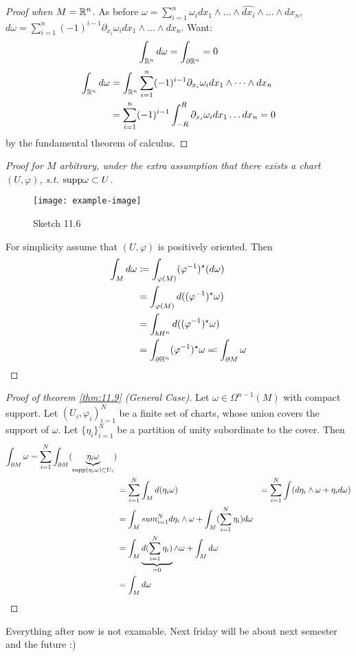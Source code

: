 \begin{proof}[Proof when \(M=\mathbb{R}^n\)]
    As before \(\omega=\sum_{i=1}^n\omega_i dx_1\wedge \dots \wedge \hat{dx_i}\wedge \dots\wedge dx_n\),
    \(d\omega=\sum_{i=1}^n(-1)^{i-1}\partial_{x_i}\omega_i dx_1\wedge \dots \wedge dx_n\). Want:
    \[\int_{\mathbb{R}^n}d\omega=\int_{\partial \mathbb{R}^n}=0\]
    \begin{align*}
        \int_{\mathbb{R}^n} d\omega&=\int_{\mathbb{R}^n} \sum_{i=1}^n(-1)^{i-1}\partial_{x_i}\omega_i dx_1\wedge \dots \wedge dx_n \\
        &=\sum_{i=1}^n(-1)^{i-1}\int_{-R}^R\partial_{x_i}\omega_i dx_1\dots dx_n =0
    \end{align*}
    by the fundamental theorem of calculus.
\end{proof}

\begin{proof}[Proof  for \(M\) arbitrary, under the extra assumption that  there exists a chart \((U,\varphi)\), s.t. 
              \(\text{supp}\omega\subset U\)]
    \begin{figure}[H]\label{fig:11.6}
        \centering
        \texttt{[image: example-image]}
        \caption{Sketch 11.6}
    \end{figure}
    For simplicity assume that \((U,\varphi)\) is positively oriented. Then 
    \begin{align*}
        \int_M d\omega&\coloneqq \int_{\varphi(M)}(\varphi^{-1})^\star(d\omega)\\
        &=\int_{\varphi(M)}d((\varphi^{-1})^\star \omega)\\
        &=\int_{bH^n} d((\varphi^{-1})^\star \omega)\\
        &=\int_{\partial \mathbb{H}^n} (\varphi^{-1})^\star \omega\eqqcolon\int_{\partial M} \omega
    \end{align*}
\end{proof}

\begin{proof}[Proof of theorem \ref{thm:11.9} (General Case)]
    Let \(\omega\in \Omega^{n-1}(M)\) with compact support. Let \((U_i,\varphi_i)_{i=1}^N\)
    be a finite set of charts, whose union covers the support of \(\omega\). Let 
    \(\{\eta_i\}_{i=1}^N\) be a partition of unity subordinate to the cover. Then 
    \begin{align*}
        \int_{\partial M}\omega= \sum_{i=1}^N\int_{\partial M} (\underbrace{\eta_i\omega}_{\text{supp}(\eta_i\omega)\subset U_i})\\
        &=\sum_{i=1}^N\int_M d(\eta_i\omega)
        &=\sum_{i=1}^N \int (d\eta_i\wedge \omega+\eta_id\omega)\\
        &=\int_M sum_{i=1}^N d\eta_i\wedge \omega +\int_M (\sum_{i=1}^N \eta_i) d\omega\\
        &=\int_M \underbrace{d(\sum_{i=1}^N \eta_i)}_{=0}\wedge \omega +\int_M d\omega\\
        &=\int_M d\omega \qedhere
    \end{align*}
\end{proof}
Everything after now is not examable. Next friday will be about next semester and the future :)
